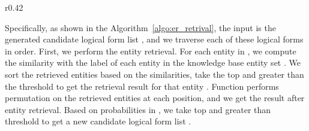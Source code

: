 \documentclass{article} \usepackage{iclr2024_conference,times}
\begin{document}
\begin{wrapfigure}{r}{0.42\textwidth}
\vspace{-4mm}
\centering
\begin{minipage}{0.42\textwidth}
    \begin{algorithm}[H] 
    \scriptsize
{}
    
    
    
    
    \;
    \ForEach{}{
        \ForEach{}{
            \;
            \ForEach{}{
                \;
                \;
            }
            \;
            \;
        }
        \;
        \;
    }
    \;
    \ForEach{}{
        \ForEach{}{
            \;
            \ForEach{}{
                \;
                \;
            }
            \;
            \;
        }
        \;
        \;
    }
    \;
    
    \label{algo:er_retrival}
    \caption{Retrieval}
\end{algorithm}
\end{minipage}
\vspace{-9mm}
\end{wrapfigure}



Specifically, as shown in the Algorithm~\ref{algo:er_retrival}, the input is the generated candidate logical form list , and we traverse each of these logical forms  in order. First, we perform the entity retrieval. For each entity  in , we compute the similarity  with the label of each entity  in the knowledge base  entity set . We sort the retrieved entities based on the similarities, take the top  and greater than the threshold  to get the retrieval result for that entity . Function  performs permutation on the retrieved entities at each position, and we get the result  after entity retrieval. Based on probabilities in , we take top  and greater than threshold  to get a new candidate logical form list .
\end{document}
